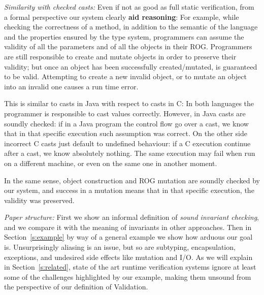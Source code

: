 \noindent\textit{Similarity with checked casts:}
Even if not as good as full static verification, from a formal perspective
 our system clearly \textbf{aid reasoning}:
For example, while checking the correctness of a method,
in addition to the semantic of the language
and the properties ensured by the type system,
programmers can assume the validity of all the parameters and of all the
objects in their ROG.
Programmers are still responsible to create and mutate objects in order to preserve their validity;
but once an object has been successfully created/mutated, is guaranteed to be valid.
Attempting to create a new invalid object, or to mutate an object into an invalid one causes
a run time error.

This is similar to casts in Java with respect to casts in C:
In both languages the programmer is responsible to cast values correctly.
However, in Java casts are soundly checked: if in a Java program the control flow go over a cast,
 we know that in that specific
execution such assumption was correct.
On the other side incorrect C casts just default to undefined behaviour:
if a C execution continue after a cast, we know absolutely nothing. The same execution
 may fail when run on a different machine, 
or even on the same one in another moment.

In the same sense, object construction and ROG mutation are soundly checked by our system,
and success in a mutation means that in that specific execution, the validity was preserved.



\noindent\textit{Paper structure:}
First we show an informal definition of \emph{sound invariant checking}, and we compare it with 
the meaning of invariants in other approaches.
Then in Section~\ref{s:example} by way of a general example we show how arduous our goal is.
Unsurprisingly aliasing is an issue, but so are subtyping, encapsulation, exceptions, and undesired side effects like mutation and I/O.
As we will explain in Section~\ref{s:related}, state of the art runtime verification systems
ignore at least some of the challenges highlighted by our example,
making them unsound from the perspective of our definition of Validation.



